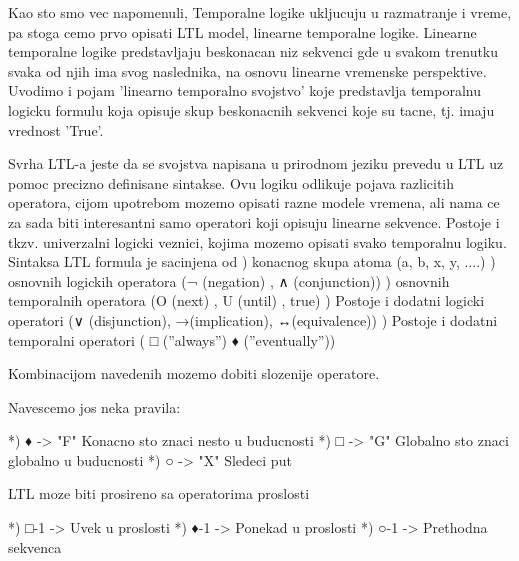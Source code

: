 \documentclass[a4paper]{article}
\begin{document}
{\newline
Kao sto smo vec napomenuli, Temporalne logike ukljucuju u razmatranje i vreme, pa stoga cemo prvo opisati LTL model, linearne temporalne logike. Linearne temporalne logike predstavljaju beskonacan niz sekvenci gde u svakom trenutku svaka od njih ima svog naslednika, na osnovu linearne vremenske perspektive. Uvodimo i pojam 'linearno temporalno svojstvo' koje predstavlja temporalnu logicku formulu koja opisuje skup beskonacnih sekvenci koje su tacne, tj. imaju vrednost 'True'. 

Svrha LTL-a jeste da se svojstva napisana u prirodnom jeziku prevedu u LTL uz pomoc precizno definisane sintakse. Ovu logiku odlikuje pojava razlicitih operatora, cijom upotrebom mozemo opisati razne modele vremena, ali nama ce za sada biti interesantni samo operatori koji opisuju linearne sekvence. Postoje i tkzv. univerzalni logicki veznici, kojima mozemo opisati svako temporalnu logiku.\newline
\newline
Sintaksa
\newline
\newline
LTL formula je sacinjena od ) konacnog skupa atoma (a, b, x, y, ....) ) osnovnih logickih operatora (¬ (negation) , ∧ (conjunction)) ) osnovnih temporalnih operatora (O (next) , U (until) , true) ) Postoje i dodatni logicki operatori (∨ (disjunction), →(implication), ↔(equivalence)) ) Postoje i dodatni temporalni operatori ( □ (”always”) ♦ (”eventually”)) \newline

Kombinacijom navedenih mozemo dobiti slozenije operatore.

Navescemo jos neka pravila: \newline

	*) ♦ -> "F" Konacno sto znaci nesto u buducnosti \newline
	*) □ -> "G" Globalno sto znaci globalno u buducnosti \newline
	*) ○ -> "X" Sledeci put \newline

LTL moze biti prosireno sa operatorima proslosti \newline
	
	*) □-1 -> Uvek u proslosti \newline
	*) ♦-1 -> Ponekad u proslosti \newline
	*) ○-1 -> Prethodna sekvenca \newline

}
\end{document}
